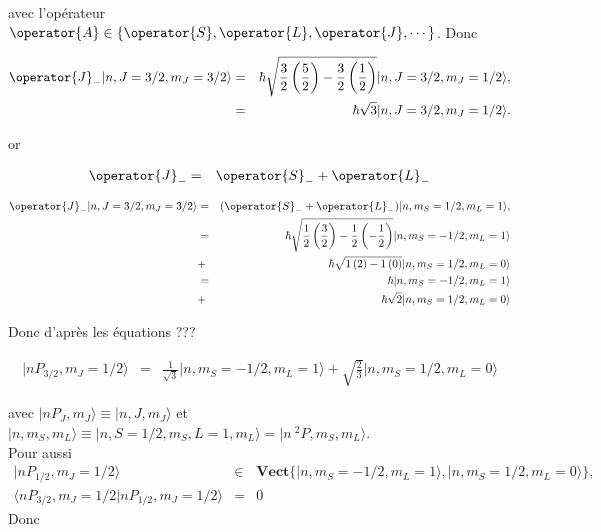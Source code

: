 avec l'opérateur $\operator{A} \in \{ \operator{S} , \operator{L} , \operator{J} , \cdots \}$. Donc  

\begin{eqnarray}
	\operator{J}_- \vert n , J = 3/2  , m_J = 3/2 \rangle & = & \hbar \sqrt{\frac{3}{2}\left(\frac{5}{2} \right ) - \frac{3}{2}\left(\frac{1}{2} \right )  } \vert n , J = 3/2  , m_J = 1/2  \rangle, \notag \\
	& = & \hbar \sqrt{3} \vert n , J = 3/2  , m_J = 1/2  \rangle.
\end{eqnarray}

or 

\begin{eqnarray}
	\operator{J}_- & = & 	\operator{S}_- + \operator{L}_-	
\end{eqnarray}

\begin{eqnarray}
	\operator{J}_- \vert n , J = 3/2  , m_J = 3/2 \rangle & = & (\operator{S}_- + \operator{L}_-) \vert n , m_S = 1/2   , m_L = 1 \rangle,\\
	& = & \hbar \sqrt{\frac{1}{2}\left(\frac{3}{2} \right ) - \frac{1}{2}\left(-\frac{1}{2} \right ) }	\vert n , m_S = -1/2   , m_L = 1 \rangle \notag \\
	& + & \hbar \sqrt{1\left(2 \right ) - 1\left(0\right ) }	\vert n , m_S = 1/2   , m_L = 0 \rangle \notag \\
	& = & \hbar \vert n , m_S = -1/2   , m_L = 1 \rangle \\ & + & \hbar \sqrt{2}	\vert n , m_S = 1/2   , m_L = 0 \rangle  
\end{eqnarray}

Donc d'après les équations ???

\begin{eqnarray}
	\vert nP_{3/2}  , m_J = 1/2  \rangle & = & \frac{1}{\sqrt{3} } \vert n , m_S=-1/2  , m_L=1 \rangle + \sqrt{\frac{2}{3}} \vert n , m_S=1/2  , m_L=0 \rangle			
\end{eqnarray}

avec $\vert nP_J  , m_J   \rangle \equiv \vert n , J  , m_J  \rangle$ et $\vert n , m_S  , m_L \rangle	 \equiv \vert n   , S=1/2 , m_S , L=1 , m_L \rangle = \vert n {~}^2P  , m_S , m_L \rangle $.\\

Pour aussi 
\begin{eqnarray}
	\vert nP_{1/2}  , m_J = 1/2   \rangle  & \in & 	\bm{Vect} \{ \vert n , m_S = -1/2  , m_L = 1  \rangle , \vert n , m_S = 1/2  , m_L = 0  \rangle  \} ,\\
	\langle  nP_{3/2}  , m_J = 1/2 \vert nP_{1/2}  , m_J = 1/2   \rangle & = & 0 		
\end{eqnarray}
Donc 

